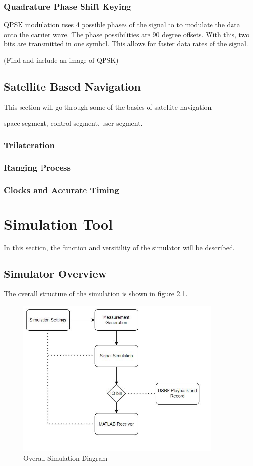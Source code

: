\documentclass[12pt]{report}
\begin{document}
\subsection{Quadrature Phase Shift Keying}

QPSK modulation uses 4 possible phases of the signal to to modulate the data onto the carrier wave. The phase possibilities are 90 degree offsets. With this, two bits are transmitted in one symbol. This allows for faster data rates of the signal. 

(Find and include an image of QPSK)

\section{Satellite Based Navigation}
This section will go through some of the basics of satellite navigation. 

space segment, control segment, user segment. 

\subsection{Trilateration}
\subsection{Ranging Process}
\subsection{Clocks and Accurate Timing}


\chapter {Simulation Tool}
In this section, the function and versitility of the simulator will be described.

\section{Simulator Overview}

The overall structure of the simulation is shown in figure \ref{fig:SimDiagram}.
\begin{figure}[ht]
    \centering
    \includegraphics[width=4.0in]{OverallSimulationDiagram}
    \caption{Overall Simulation Diagram}
    \label{fig:SimDiagram}
\end{figure}
\end{document}
